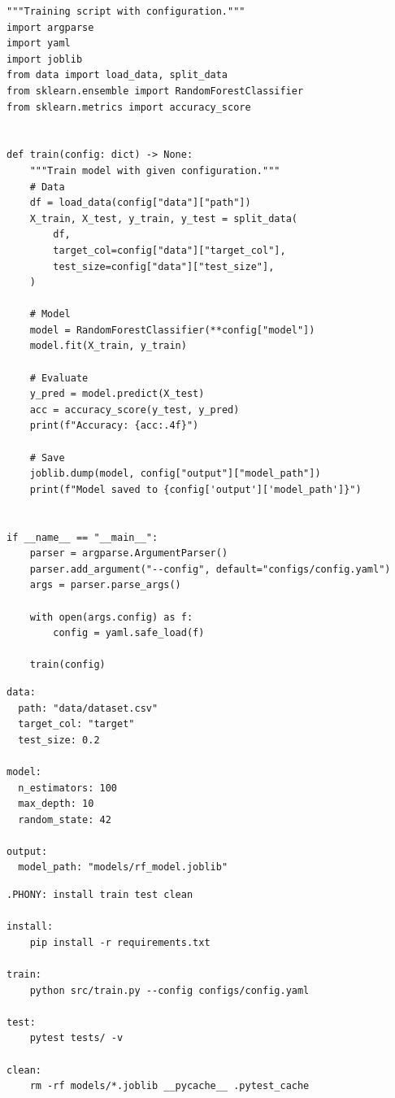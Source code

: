 \begin{codeblock}[title=\textbf{src/train.py --- Script d'entra\^inement}]
\begin{verbatim}
"""Training script with configuration."""
import argparse
import yaml
import joblib
from data import load_data, split_data
from sklearn.ensemble import RandomForestClassifier
from sklearn.metrics import accuracy_score


def train(config: dict) -> None:
    """Train model with given configuration."""
    # Data
    df = load_data(config["data"]["path"])
    X_train, X_test, y_train, y_test = split_data(
        df,
        target_col=config["data"]["target_col"],
        test_size=config["data"]["test_size"],
    )

    # Model
    model = RandomForestClassifier(**config["model"])
    model.fit(X_train, y_train)

    # Evaluate
    y_pred = model.predict(X_test)
    acc = accuracy_score(y_test, y_pred)
    print(f"Accuracy: {acc:.4f}")

    # Save
    joblib.dump(model, config["output"]["model_path"])
    print(f"Model saved to {config['output']['model_path']}")


if __name__ == "__main__":
    parser = argparse.ArgumentParser()
    parser.add_argument("--config", default="configs/config.yaml")
    args = parser.parse_args()

    with open(args.config) as f:
        config = yaml.safe_load(f)

    train(config)
\end{verbatim}
\end{codeblock}

\begin{codeblock}[title=\textbf{configs/config.yaml}]
\begin{verbatim}
data:
  path: "data/dataset.csv"
  target_col: "target"
  test_size: 0.2

model:
  n_estimators: 100
  max_depth: 10
  random_state: 42

output:
  model_path: "models/rf_model.joblib"
\end{verbatim}
\end{codeblock}

\begin{codeblock}[title=\textbf{Makefile}]
\begin{verbatim}
.PHONY: install train test clean

install:
	pip install -r requirements.txt

train:
	python src/train.py --config configs/config.yaml

test:
	pytest tests/ -v

clean:
	rm -rf models/*.joblib __pycache__ .pytest_cache
\end{verbatim}
\end{codeblock}

